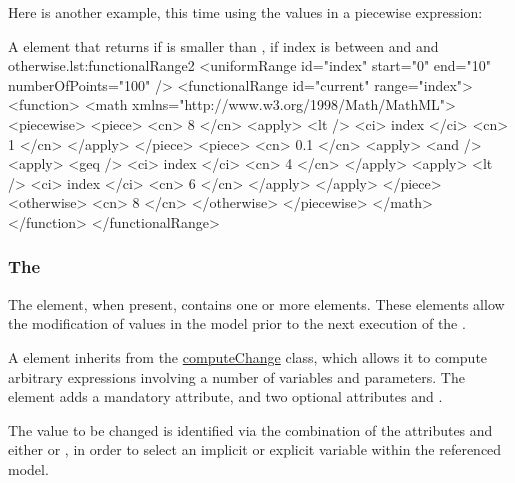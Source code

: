 Here is another example, this time using the values in a piecewise expression: 

\begin{myXmlLst}{A  element that returns  if  is smaller than ,  if index is between  and  and  otherwise.}{lst:functionalRange2}
        <uniformRange id="index" start="0" end="10" numberOfPoints="100" />
        <functionalRange id="current" range="index">
          <function>
            <math xmlns="http://www.w3.org/1998/Math/MathML">
              <piecewise>
                <piece>
                  <cn> 8 </cn>
                  <apply>
                    <lt />
                    <ci> index </ci>
                    <cn> 1 </cn>
                  </apply>
                </piece>
                <piece>
                  <cn> 0.1 </cn>
                  <apply>
                    <and />
                    <apply>
                      <geq />
                      <ci> index </ci>
                      <cn> 4 </cn>
                    </apply>
                    <apply>
                      <lt />
                      <ci> index </ci>
                      <cn> 6 </cn>
                    </apply>
                  </apply>
                </piece>
                <otherwise>
                  <cn> 8 </cn>
                </otherwise>
              </piecewise>
            </math>
          </function>
        </functionalRange>
\end{myXmlLst}



\subsubsection{The }
\label{sec:changes}
\label{class:setValue}

The  element, when present, contains one or more  elements.
These elements allow the modification of values in the model prior to the next execution of the .

A  element inherits from the \hyperref[class:computeChange]{computeChange} class, which allows it to compute arbitrary expressions involving a number of variables and parameters.
The element  adds a mandatory  attribute, and two optional attributes  and .

The value to be changed is identified via the combination of the attributes  and either  or , in order to select an implicit or explicit variable within the referenced model.

